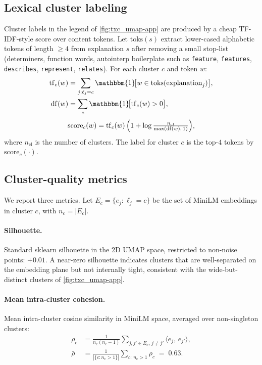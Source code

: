\subsection{Lexical cluster labeling}
\label{app:meta-label}
Cluster labels in the legend of \cref{fig:txc_umap-app} are produced by a cheap TF-IDF-style score over content tokens. Let $\mathrm{toks}(s)$ extract lower-cased alphabetic tokens of length $\geq 4$ from explanation $s$ after removing a small stop-list (determiners, function words, autointerp boilerplate such as \texttt{feature}, \texttt{features}, \texttt{describes}, \texttt{represent}, \texttt{relates}). For each cluster $c$ and token $w$:
\begin{equation}
    \begin{aligned}
    \mathrm{tf}_c(w) &= \sum_{j:\ell_j=c} \mathbbm{1}\!\bigl[w \in \mathrm{toks}(\text{explanation}_j)\bigr], \\
    \mathrm{df}(w)   &= \sum_{c} \mathbbm{1}\!\bigl[\mathrm{tf}_c(w) > 0\bigr],
    \end{aligned}
\end{equation}
\begin{equation}
    \mathrm{score}_c(w) = \mathrm{tf}_c(w)\,\Bigl(1 + \log\tfrac{n_{\text{cl}}}{\max(\mathrm{df}(w),\,1)}\Bigr),
\end{equation}
where $n_{\text{cl}}$ is the number of clusters. The label for cluster $c$ is the top-$4$ tokens by $\mathrm{score}_c(\cdot)$.

\subsection{Cluster-quality metrics}
\label{app:meta-metrics}
We report three metrics. Let $E_c = \{e_j : \ell_j = c\}$ be the set of MiniLM embeddings in cluster $c$, with $n_c = |E_c|$.

\paragraph{Silhouette.} Standard sklearn silhouette in the 2D UMAP space, restricted to non-noise points: $+0.01$. A near-zero silhouette indicates clusters that are well-separated on the embedding plane but not internally tight, consistent with the wide-but-distinct clusters of \cref{fig:txc_umap-app}.

\paragraph{Mean intra-cluster cohesion.} Mean intra-cluster cosine similarity in MiniLM space, averaged over non-singleton clusters:
\begin{equation}
    \begin{aligned}
    \rho_c &= \frac{1}{n_c(n_c-1)} \sum_{j, j' \in E_c,\, j\neq j'} \langle e_j,\, e_{j'}\rangle, \\
    \bar{\rho} &= \frac{1}{|\{c: n_c > 1\}|}\sum_{c:\,n_c>1}\rho_c \;=\; 0.63.
    \end{aligned}
\end{equation}

